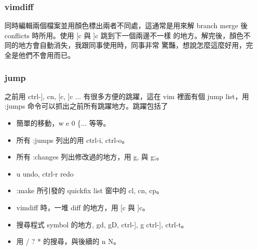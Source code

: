       \subsubsection{vimdiff}
      同時編輯兩個檔案並用顏色標出兩者不同處，這通常是用來解
      branch merge 後 conflicts 時所用。使用 [c 與 ]c 跳到下一個兩邊不一樣
      的地方。解完後，顏色不同的地方會自動消失，我跟同事使用時，同事非常
      驚豔，想說怎麼這麼好用，完全是他們不會用而已。

      \subsubsection{jump}
      之前用 ctrl-], cn, [c, ]c ... 有很多方便的跳躍，這在 vim 裡面有個
      jump list，用 :jumps 命令可以抓出之前所有跳躍地方。跳躍包括了
      \begin{itemize}
        \item 簡單的移動，w e 0 \{... 等等。
        \item 所有 :jumps 列出的用 ctrl-i, ctrl-o。
        \item 所有 :changes 列出修改過的地方，用 g, 與 g;。
        \item u undo, ctrl-r redo
        \item :make 所引發的 quickfix list 窗中的 cl, cn, cp。
        \item vimdiff 時，一堆 diff 的地方，用 [c 與 ]c。
        \item 搜尋程式 symbol 的地方, gd, gD, ctrl-], g ctrl-], ctrl-t。
        \item 用 / ? * 的搜尋，與後續的 n N。
      \end{itemize}

